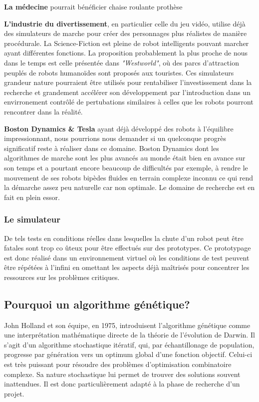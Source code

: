 \documentclass[journal, a4paper]{IEEEtran}
\begin{document}
	\textbf{La médecine} pourrait bénéficier chaise roulante prothèse

	\textbf{L'industrie du divertissement}, en particulier celle du
	jeu vidéo,
	utilise déjà des simulateurs de marche pour créer des personnages
	plus réalistes de manière procédurale.
	La Science-Fiction est pleine de robot intelligents pouvant
	marcher ayant différentes fonctions.
	La proposition probablement la plus proche de nous dans le
	temps est celle présentée dans \textit{"Westworld"}, où des parcs
	d'attraction peuplés de robots humanoïdes sont proposés aux
	touristes. Ces simulateurs grandeur nature pourraient être
	utilisés pour rentabiliser l'investissement dans la recherche
	et grandement accélérer son développement par l'introduction dans
	un envirronement contrôlé de
	pertubations similaires à celles que les robots pourront rencontrer
	dans
	la réalité.

	\textbf{Boston Dynamics \& Tesla} ayant déjà développé des robots
	à l'équilibre impressionnant, nous pourrions nous demander si un
	quelconque progrès significatif reste à réaliser dans ce domaine.
	Boston Dynamics dont les algorithmes de marche sont les plus
	avancés au monde était bien en avance sur son temps et a pourtant
	encore beaucoup de difficultés par exemple, à rendre le mouvement
	de
	ses robots
	bipèdes fluides en terrain complexe inconnu ce qui rend la démarche
	assez peu naturelle car non optimale. Le
	domaine de recherche est en fait en plein essor.

	\subsubsection{Le simulateur}
	De tels tests en conditions réelles dans lesquelles la chute
	d'un robot peut être fatales sont trop co
	ûteux
	pour être effectués sur des prototypes.
	Ce prototypage est donc réalisé dans un environnement virtuel où les
	conditions de test peuvent être répétées à l'infini en omettant les
	aspects déjà maîtrisés pour concentrer les ressources sur les
	problèmes critiques.


	\subsection{Pourquoi un algorithme génétique?}\label{subsec:pourquoi-un-algorithme-genetique?}
	John Holland et son équipe, en 1975, introduisent
	l'algorithme génétique\cite{systems-adaptation} comme une
	interprétation mathématique directe de la théorie de l'évolution de
	Darwin.
	Il s'agit d'un algorithme stochastique itératif, qui, par
	échantillonage de population, progresse par génération
	vers	un optimum global d’une fonction objectif.
	Celui-ci est très puissant pour résoudre des problèmes
	d'optimisation combinatoire complexe.
	Sa nature stochastique lui permet de trouver des solutions souvent
	inattendues. Il est donc particulièrement adapté à la phase de
	recherche d'un projet.
\end{document}

